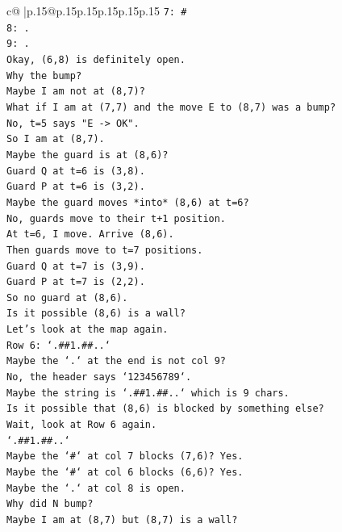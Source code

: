 \documentclass{article}
\begin{document}
{\begin{supertabular}{c@{$\;$}|p{.15\linewidth}@{}p{.15\linewidth}p{.15\linewidth}p{.15\linewidth}p{.15\linewidth}p{.15\linewidth}}
{{{\texttt{7: \#} \\
\texttt{8: .} \\
\texttt{9: .} \\
\texttt{Okay, (6,8) is definitely open.} \\
\texttt{Why the bump?} \\
\texttt{Maybe I am not at (8,7)?} \\
\texttt{What if I am at (7,7) and the move E to (8,7) was a bump?} \\
\texttt{No, t=5 says "E {-}> OK".} \\
\texttt{So I am at (8,7).} \\
\texttt{Maybe the guard is at (8,6)?} \\
\texttt{Guard Q at t=6 is (3,8).} \\
\texttt{Guard P at t=6 is (3,2).} \\
\texttt{Maybe the guard moves *into* (8,6) at t=6?} \\
\texttt{No, guards move to their t+1 position.} \\
\texttt{At t=6, I move. Arrive (8,6).} \\
\texttt{Then guards move to t=7 positions.} \\
\texttt{Guard Q at t=7 is (3,9).} \\
\texttt{Guard P at t=7 is (2,2).} \\
\texttt{So no guard at (8,6).} \\
\texttt{Is it possible (8,6) is a wall?} \\
\texttt{Let's look at the map again.} \\
\texttt{Row 6: `.\#\#1.\#\#..`} \\
\texttt{Maybe the `.` at the end is not col 9?} \\
\texttt{No, the header says `123456789`.} \\
\texttt{Maybe the string is `.\#\#1.\#\#..` which is 9 chars.} \\
\texttt{Is it possible that (8,6) is blocked by something else?} \\
\texttt{Wait, look at Row 6 again.} \\
\texttt{`.\#\#1.\#\#..`} \\
\texttt{Maybe the `\#` at col 7 blocks (7,6)? Yes.} \\
\texttt{Maybe the `\#` at col 6 blocks (6,6)? Yes.} \\
\texttt{Maybe the `.` at col 8 is open.} \\
\texttt{Why did N bump?} \\
\texttt{Maybe I am at (8,7) but (8,7) is a wall?} \\
}}}
\end{supertabular}}
\end{document}
